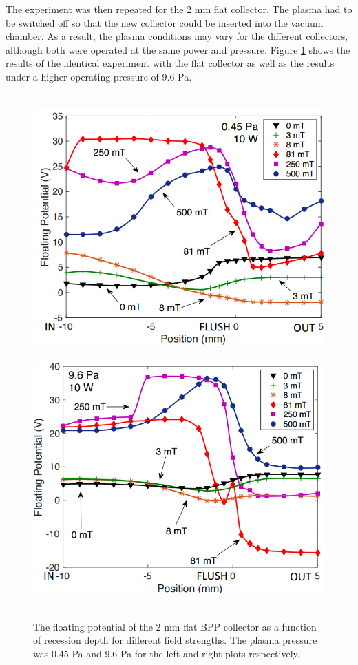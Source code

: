 The experiment was then repeated for the 2 mm flat collector. The plasma had to be switched off so that the new collector could be inserted into the vacuum chamber. As a result, the plasma conditions may vary for the different collectors, although both were operated at the same power and pressure. Figure \ref{fig:pressure} shows the results of the identical experiment with the flat collector as well as the results under a higher operating pressure of 9.6 Pa.  


\begin{figure}[H]
	\hbox{%
		\includegraphics[width=.5\textwidth]{flat_low_pressure.png}%
	}%
	\hbox{%
		\includegraphics[width=.5\textwidth]{flat_high_pressure.png}%
	}%
	
	\noindent
	\parbox{.5\textwidth}{%
		\centering
		
	}%
	\hfil
	\parbox{.5\textwidth}{%
		\centering
		
	}%
	
	\caption{The floating potential of the 2 mm flat BPP collector as a function of recession depth for different field strengths. The plasma pressure was 0.45 Pa and 9.6 Pa for the left and right plots respectively.}
	\label{fig:pressure}
\end{figure}
%
%

